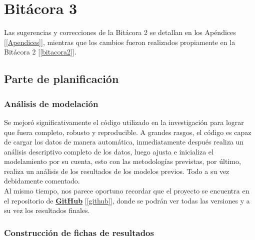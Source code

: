 \chapter{Bitácora 3} \label{bitacora3}

Las sugerencias y correcciones de la Bitácora 2 se detallan en los Apéndices [\ref{Apendices}], mientras que los cambios fueron realizados propiamente en la Bitácora 2 [\ref{bitacora2}]. 

\section{Parte de planificación}

\subsection{Análisis de modelación}

Se mejoró significativamente el código utilizado en la investigación para lograr que fuera completo, robusto y reproducible. A grandes rasgos, el código es capaz de cargar los datos de manera automática, inmediatamente después realiza un análisis descriptivo completo de los datos, luego ajusta e inicializa el modelamiento por su cuenta, esto con las metodologías previstas, por último, realiza un análisis de los resultados de los modelos previos. Todo a su vez debidamente comentado.\\

Al mismo tiempo, nos parece oportuno recordar que el proyecto se encuentra en el repositorio de \textbf{\href{https://github.com/bluke7ide/Proyecto_Estadistica}{GitHub}} [\ref{github}], donde se podrán ver todas las versiones y a su vez los resultados finales.
\pagebreak

\subsection{Construcción de fichas de resultados}

